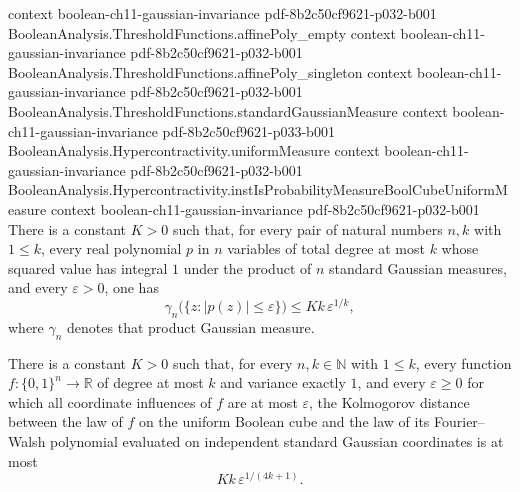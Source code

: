 \begin{theorem}
  {context}
  {boolean-ch11-gaussian-invariance}
  {pdf-8b2c50cf9621-p032-b001}
\proofstep
  {BooleanAnalysis.ThresholdFunctions.affinePoly_empty}
  {context}
  {boolean-ch11-gaussian-invariance}
  {pdf-8b2c50cf9621-p032-b001}
\proofstep
  {BooleanAnalysis.ThresholdFunctions.affinePoly_singleton}
  {context}
  {boolean-ch11-gaussian-invariance}
  {pdf-8b2c50cf9621-p032-b001}
\proofstep
  {BooleanAnalysis.ThresholdFunctions.standardGaussianMeasure}
  {context}
  {boolean-ch11-gaussian-invariance}
  {pdf-8b2c50cf9621-p033-b001}
\proofstep
  {BooleanAnalysis.Hypercontractivity.uniformMeasure}
  {context}
  {boolean-ch11-gaussian-invariance}
  {pdf-8b2c50cf9621-p032-b001}
\proofstep
  {BooleanAnalysis.Hypercontractivity.instIsProbabilityMeasureBoolCubeUniformMeasure}
  {context}
  {boolean-ch11-gaussian-invariance}
  {pdf-8b2c50cf9621-p032-b001}
There is a constant $K>0$ such that, for every pair of natural numbers $n,k$ with $1\le
k$, every real polynomial $p$ in $n$ variables of total degree at most $k$ whose squared
value has integral $1$ under the product of $n$ standard Gaussian measures, and every
$\varepsilon>0$, one has
\[
\gamma_n\bigl(\{z:|p(z)|\le\varepsilon\}\bigr)\le Kk\,\varepsilon^{1/k},
\]
where $\gamma_n$ denotes that product Gaussian measure.
\end{theorem}

\begin{theorem}
\label{BooleanAnalysis.GaussianSpace.invariance_cdf}
\leanok
{}
There is a constant $K>0$ such that, for every $n,k\in\mathbb N$ with $1\le k$, every
function $f:\{0,1\}^n\to\mathbb R$ of degree at most $k$ and variance exactly $1$, and
every $\varepsilon\ge0$ for which all coordinate influences of $f$ are at most
$\varepsilon$, the Kolmogorov distance between the law of $f$ on the uniform Boolean
cube and the law of its Fourier--Walsh polynomial evaluated on independent standard
Gaussian coordinates is at most
\[
Kk\,\varepsilon^{1/(4k+1)}.
\]
\end{theorem}
